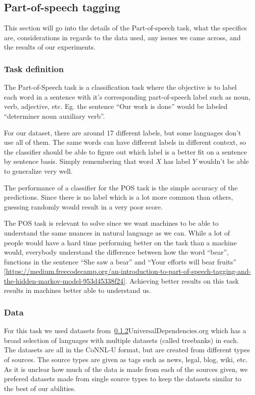 
\subsection{Part-of-speech tagging}

This section will go into the details of the Part-of-speech task, what the
specifics are, considerations in regards to the data used, any issues we came
across, and the results of our experiments.

\subsubsection{Task definition}

The Part-of-Speech task is a classification task where the objective is to label
each word in a sentence with it's corresponding part-of-speech label such as
noun, verb, adjective, etc. Eg. the sentence ``Our work is done'' would be
labeled ``determiner noun auxiliary verb''.

For our dataset, there are around 17 different labels, but some languages don't
use all of them. The same words can have different labels in different context,
so the classifier should be able to figure out which label is a better fit on a
sentence by sentence basis. Simply remembering that word $X$ has label $Y$
wouldn't be able to generalize very well.

The performance of a classifier for the POS task is the simple accuracy of the
predictions. Since there is no label which is a lot more common than others,
guessing randomly would result in a very poor score. 

The POS task is relevant to solve since we want machines to be able to
understand the same nuances in natural language as we can. While a lot of people
would have a hard time performing better on the task than a machine would,
everybody understand the difference between how the word ``bear'', functions in
the sentence ``She saw a bear'' and ``Your efforts will bear fruits''
\ref{https://medium.freecodecamp.org/an-introduction-to-part-of-speech-tagging-and-the-hidden-markov-model-953d45338f24}.
Achieving better results on this task results in machines better able to
understand us.

\subsubsection{Data}

For this task we used datasets from~\ref{}{UniversalDependencies.org} which has
a broad selection of languages with multiple datasets (called treebanks) in
each. The datasets are all in the CoNNL-U format, but are created from different
types of sources. The source types are given as tags such as news, legal, blog,
wiki, etc. As it is unclear how much of the data is made from each of the
sources given, we prefered datasets made from single source types to keep the
datasets similar to the best of our abilities.

